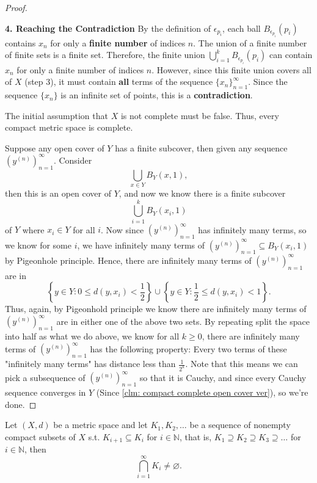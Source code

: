 \begin{proof}
\begin{explanation}
        \textbf{4. Reaching the Contradiction}
        By the definition of $\epsilon_{p_i}$, each ball $B_{\epsilon_{p_i}}(p_i)$ contains $x_n$ for only a \textbf{finite number} of indices $n$.
        The union of a finite number of finite sets is a finite set. Therefore, the finite union
        $\bigcup_{i=1}^k B_{\epsilon_{p_i}}(p_i)$
        can contain $x_n$ for only a finite number of indices $n$.
        However, since this finite union covers all of $X$ (step 3), it must contain \textbf{all} terms of the sequence $\{x_n\}_{n=1}^{\infty}$.
        Since the sequence $\{x_n\}$ is an infinite set of points, this is a \textbf{contradiction}.

        The initial assumption that $X$ is not complete must be false.
        Thus, every compact metric space is complete.
    \end{explanation}      
    Suppose any open cover of \(Y\) has a finite subcover, then given any sequence \(\left( y^{(n)} \right)_{n=1}^{\infty}  \). Consider 
    \[
        \bigcup_{x \in Y} B_Y \left( x, 1 \right),  
    \] then this is an open cover of \(Y\), and now we know there is a finite subcover
    \[
        \bigcup_{i=1}^{k} B_Y \left( x_{i} , 1 \right) 
    \] of \(Y\) where \(x_i \in Y\) for all \(i\). Now since \(\left( y^{(n)} \right)_{n=1}^{\infty}  \) has infinitely many terms, so we know for some \(i\), we have infinitely many terms of \(\left( y^{(n)} \right)_{n=1}^{\infty} \subseteq B_Y \left( x_i, 1 \right)  \) by Pigeonhole principle. Hence, there are infinitely many terms of \(\left( y^{(n)} \right)_{n=1}^{\infty}  \) are in 
    \[
        \left\{ y \in Y: 0 \le d(y, x_i) < \frac{1}{2} \right\} \cup \left\{ y \in Y: \frac{1}{2} \le d(y, x_i) < 1 \right\}.  
    \]  Thus, again, by Pigeonhold principle we know there are infinitely many terms of \(\left( y^{(n)} \right)_{n=1}^{\infty}  \) are in either one of the above two sets. By repeating split the space into half as what we do above, we know for all \(k \ge 0\), there are infinitely many terms of \(\left( y^{(n)} \right)_{n=1}^{\infty}  \) has the following property: Every two terms of these "infinitely many terms" has distance less than \(\frac{1}{2^k}\). Note that this means we can pick a subsequence of \(\left( y^{(n)} \right)_{n=1}^{\infty}  \) so that it is Cauchy, and since every Cauchy sequence converges in \(Y\) (Since \autoref{clm: compact complete open cover ver}), so we're done.
    
    
\end{proof}
\begin{corollary} \label{cl: compact nesting then intersection nonempty}
    Let \((X, d)\) be a metric space and let \(K_1, K_2, \dots \) be a sequence of nonempty compact subsets of \(X\) s.t. \(K_{i+1} \subseteq K_i\) for \(i \in \mathbb{N} \), that is, \(K_1 \supseteq K_2 \supseteq K_3 \supseteq \dots  \) for \(i \in \mathbb{N} \), then 
    \[
        \bigcap_{i=1}^{\infty} K_i \neq \varnothing. 
    \]       
\end{corollary}
